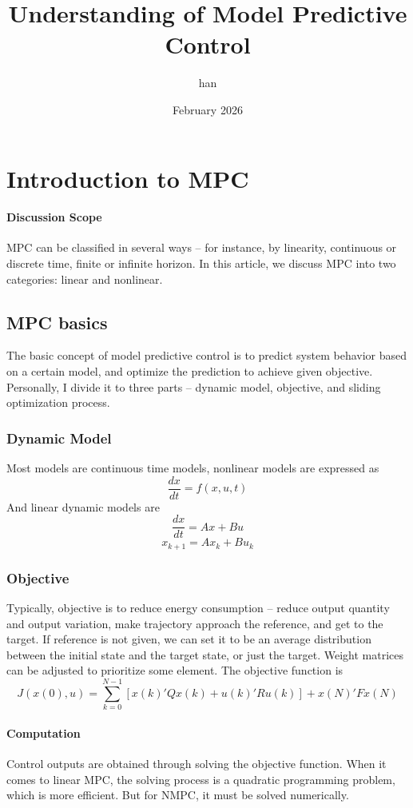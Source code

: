 \documentclass{article}
\title{Understanding of Model Predictive Control}
\author{han}
\date{February 2026}
\begin{document}
\maketitle

\section{Introduction to MPC}
\paragraph{Discussion Scope}MPC can be classified in several ways -- for instance, by linearity, continuous or discrete time, finite or infinite horizon. In this article, we discuss MPC into two categories: linear and nonlinear.
\subsection{MPC basics}
The basic concept of model predictive control is to predict system behavior based on a certain model, and optimize the prediction to achieve given objective. Personally, I divide it to three parts -- dynamic model, objective, and sliding optimization process.
\subsubsection{Dynamic Model}
Most models are continuous time models, nonlinear models are expressed as
\[ \frac{dx}{dt} = f(x,u,t) \]
And linear dynamic models are
\[\frac{dx}{dt}=Ax + Bu\]
\[x_{k+1} = Ax_k +B u_k\]
\subsubsection{Objective}
Typically, objective is to reduce energy consumption -- reduce output quantity and output variation, make trajectory approach the reference, and get to the target. If reference is not given, we can set it to be an average distribution between the initial state and the target state, or just the target. Weight matrices can be adjusted to prioritize some element.
The objective function is
\[J(x(0),u)=\sum_{k=0}^{N-1}[x(k)'Qx(k)+u(k)'Ru(k)] + x(N)'Fx(N)\]

\paragraph{Computation}
Control outputs are obtained through solving the objective function. When it comes to linear MPC, the solving process is a quadratic programming problem, which is more efficient. But for NMPC, it must be solved numerically.
\end{document}
